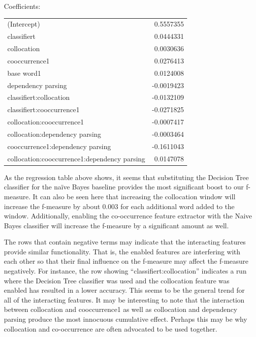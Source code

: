 \documentclass{article}
\newcommand{\naive}{na\"ive}
\begin{document}
Coefficients:

\begin{tabular}{l r}
                                (Intercept) & 0.5557355 \\
                                classifiert & 0.0444331  \\
                                 collocation & 0.0030636  \\
                              cooccurrence1 & 0.0276413 \\
                                 base word1 & 0.0124008  \\
                         dependency parsing & -0.0019423 \\
                     classifiert:collocation & -0.0132109 \\
                  classifiert:cooccurrence1 & -0.0271825 \\
                   collocation:cooccurrence1 & -0.0007417 \\
              collocation:dependency parsing & -0.0003464 \\
           cooccurrence1:dependency parsing & -0.1611043 \\
collocation:cooccurrence1:dependency parsing & 0.0147078  \\
\end{tabular}

As the regression table above shows, it seems that substituting the
Decision Tree classifier for the \naive{} Bayes baseline provides the
most significant boost to our f-measure. It can also be seen here that
increasing the collocation window will increase the f-measure by about 0.003
for each additional word added to the window. Additionally, enabling
the co-occurrence feature extractor with the Naive Bayes classifier
will increase the f-measure by a significant amount as well.

The rows that contain negative terms may indicate that the interacting
features provide similar functionality. That is, the enabled features
are interfering with each other so that their final influence on the
f-measure may affect the f-measure negatively. For instance, the row
showing ``classifiert:collocation'' indicates a run where the Decision
Tree classifier was used and the collocation feature was enabled has
resulted in a lower accuracy. This seems to be the general trend for
all of the interacting features. It may be interesting to note that
the interaction between collocation and cooccurrence1 as well as
collocation and dependency parsing produce the most innocuous
cumulative effect. Perhaps this may be why collocation and
co-occurrence are often advocated to be used together.
\end{document}
